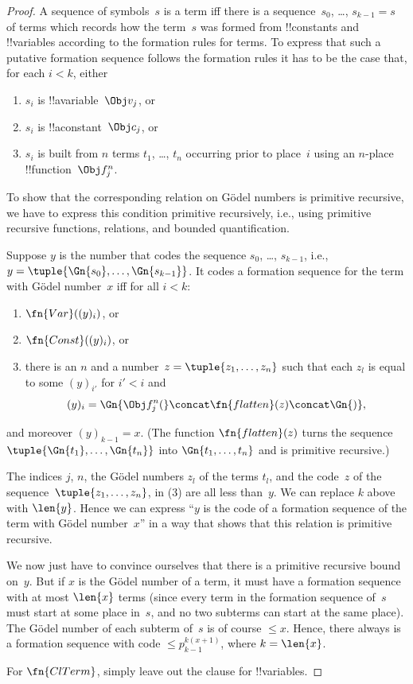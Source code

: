 \documentclass[../../../include/open-logic-section]{subfiles}
\begin{document}
\begin{proof}
A sequence of symbols~$s$ is a term iff there is a sequence~$s_0$,
\dots, $s_{k-1} = s$ of terms which records how the term~$s$ was formed
from !!{constant}s and !!{variable}s according to the formation rules
for terms. To express that such a putative formation sequence follows
the formation rules it has to be the case that, for each $i < k$, either
\begin{enumerate}
\item $s_i$ is !!a{variable}~$\Obj v_j$, or
\item $s_i$ is !!a{constant}~$\Obj c_j$, or
\item $s_i$ is built from $n$ terms $t_1$, \dots, $t_n$ occurring
  prior to place~$i$ using an $n$-place !!{function}~$\Obj f^n_j$.
\end{enumerate}
To show that the corresponding relation on G\"odel numbers is
primitive recursive, we have to express this condition primitive
recursively, i.e., using primitive recursive functions, relations, and
bounded quantification.

Suppose $y$ is the number that codes the sequence $s_0$, \dots, $s_{k-1}$,
i.e., $y = \tuple{\Gn{s_0}, \dots, \Gn{s_{k-1}}}$.  It codes a formation
sequence for the term with G\"odel number~$x$ iff for all $i < k$:
\begin{enumerate}
\item $\fn{Var}((y)_i)$, or
\item $\fn{Const}((y)_i)$, or
\item there is an $n$ and a number~$z = \tuple{z_1, \dots, z_n}$ such
  that each $z_l$ is equal to some $(y)_{i'}$ for $i' < i$ and
\[
(y)_i = \Gn{\Obj f^n_j(} \concat \fn{flatten}(z) \concat \Gn{)},
\]
\end{enumerate}
and moreover $(y)_{k-1} = x$.  (The function $\fn{flatten}(z)$ turns
the sequence $\tuple{\Gn{t_1}, \dots, \Gn{t_n}}$ into $\Gn{t_1, \dots,
  t_n}$ and is primitive recursive.)

The indices $j$, $n$, the G\"odel numbers $z_l$ of the terms $t_l$,
and the code~$z$ of the sequence~$\tuple{z_1, \dots, z_n}$, in (3) are
all less than~$y$.  We can replace $k$ above with $\len{y}$.  Hence we
can express ``$y$ is the code of a formation sequence of the term with
G\"odel number~$x$'' in a way that shows that this relation is
primitive recursive.

We now just have to convince ourselves that there is a primitive
recursive bound on~$y$.  But if $x$ is the G\"odel number of a term,
it must have a formation sequence with at most $\len{x}$ terms (since
every term in the formation sequence of~$s$ must start at some place
in~$s$, and no two subterms can start at the same place).  The G\"odel
number of each subterm of~$s$ is of course $\le x$.  Hence, there
always is a formation sequence with code $\le p_{k-1}^{k(x+1)}$, where
$k=\len{x}$.

For $\fn{ClTerm}$, simply leave out the clause for !!{variable}s.
\end{proof}
\end{document}
